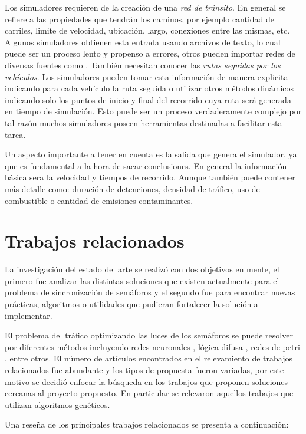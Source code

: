 Los simuladores requieren de la creación de una \emph{red de tránsito}. En general se refiere a las propiedades que tendrán los caminos, por ejemplo cantidad de carriles, limite de velocidad, ubicación, largo, conexiones entre las mismas, etc. Algunos simuladores obtienen esta entrada usando archivos de texto, lo cual puede ser un proceso lento y propenso a errores, otros pueden importar redes de diversas fuentes como \citet{OSM}. También necesitan conocer las\emph{ rutas seguidas por los vehículos}. Los simuladores pueden tomar esta información de manera explicita indicando para cada vehículo la ruta seguida o utilizar otros métodos dinámicos indicando solo los puntos de inicio y final del recorrido cuya ruta será generada en tiempo de simulación. Esto puede ser un proceso verdaderamente complejo por tal razón muchos simuladores poseen herramientas destinadas a facilitar esta tarea.

Un aspecto importante a tener en cuenta es la salida que genera el simulador, ya que es fundamental a la hora de sacar conclusiones. En general la información básica sera la velocidad y tiempos de recorrido. Aunque también puede contener más detalle como: duración de detenciones, densidad de tráfico, uso de combustible o cantidad de emisiones contaminantes.  
 
\section{Trabajos relacionados}

La investigación del estado del arte se realizó con dos objetivos en mente, el primero fue analizar las distintas soluciones que existen actualmente para el problema de sincronización de semáforos y el segundo fue para encontrar nuevas prácticas, algoritmos o utilidades que pudieran fortalecer la solución a implementar.

El problema del tráfico optimizando las luces de los semáforos se puede resolver por diferentes métodos incluyendo  redes neuronales \citep{Lopez1999}, lógica difusa \citep{Lim2001}, redes de petri \citep{DiFebbraro2002}, entre otros. El número de artículos encontrados en el relevamiento de trabajos relacionados fue abundante y los tipos de propuesta fueron variadas, por este motivo se decidió enfocar la búsqueda en los trabajos que proponen soluciones cercanas al proyecto propuesto. En particular se relevaron aquellos trabajos que utilizan algoritmos genéticos.

Una reseña de los principales trabajos relacionados se presenta a continuación:


